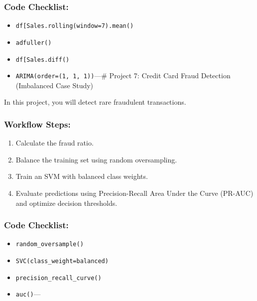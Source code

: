 \subsubsection{Code Checklist:}\label{code-checklist-5}

\begin{itemize}
\tightlist
\item
  \texttt{df{[}\textquotesingle{}Sales\textquotesingle{}{]}.rolling(window=7).mean()}
\item
  \texttt{adfuller()}
\item
  \texttt{df{[}\textquotesingle{}Sales\textquotesingle{}{]}.diff()}
\item
  \texttt{ARIMA(order=(1,\ 1,\ 1))}\n\n---\n\n\# Project 7: Credit Card
  Fraud Detection (Imbalanced Case Study)
\end{itemize}

In this project, you will detect rare fraudulent transactions.

\subsubsection{Workflow Steps:}\label{workflow-steps-6}

\begin{enumerate}
\def\labelenumi{\arabic{enumi}.}
\tightlist
\item
  Calculate the fraud ratio.
\item
  Balance the training set using random oversampling.
\item
  Train an SVM with balanced class weights.
\item
  Evaluate predictions using Precision-Recall Area Under the Curve
  (PR-AUC) and optimize decision thresholds.
\end{enumerate}

\subsubsection{Code Checklist:}\label{code-checklist-6}

\begin{itemize}
\tightlist
\item
  \texttt{random\_oversample()}
\item
  \texttt{SVC(class\_weight=\textquotesingle{}balanced\textquotesingle{})}
\item
  \texttt{precision\_recall\_curve()}
\item
  \texttt{auc()}\n\n---\n\n
\end{itemize}

